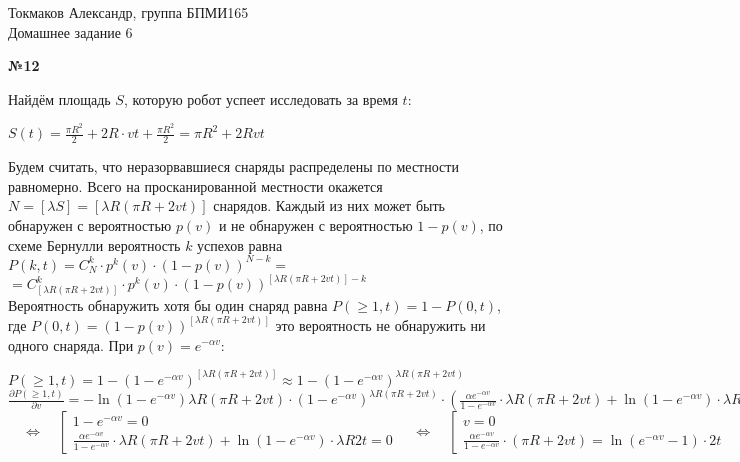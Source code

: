 \documentclass{article}
\newcommand{\impl}{\quad\Leftrightarrow\quad}
\newenvironment{task}{\begin{center}\fontsize{14}{14}\selectfont\bf}{\rm\fontsize{12}{12}\selectfont\end{center}}
\begin{document}
	\begin{center}
		Токмаков Александр, группа БПМИ165 \\
		Домашнее задание 6
	\end{center}
	
	\begin{task} 
		№12
	\end{task}
	Найдём площадь $S$, которую робот успеет исследовать за время $t$:
	\begin{center}
		$S(t) = \frac{\pi R^2}{2} + 2R\cdot vt + \frac{\pi R^2}{2} = \pi R^2 + 2Rvt$
	\end{center}
	Будем считать, что неразорвавшиеся снаряды распределены по местности равномерно. Всего на просканированной местности окажется $N = \left[\lambda S\right] = \left[\lambda R(\pi R + 2vt)\right]$ снарядов. Каждый из них может быть обнаружен с вероятностью $p(v)$ и не обнаружен с вероятностью $1 - p(v)$, по схеме Бернулли вероятность $k$ успехов равна $P(k, t) = C_N^k\cdot p^k(v) \cdot (1 - p(v))^{N-k} = $\\ 
	$= C_{\left[\lambda R( \pi R + 2vt)\right]}^k\cdot p^k(v) \cdot (1 - p(v))^{\left[\lambda R(\pi R + 2vt)\right]-k}$ \\
	Вероятность обнаружить хотя бы один снаряд равна $P(\geq 1, t) = 1 - P(0, t)$, где $P(0, t) = (1 - p(v))^{\left[\lambda R(\pi R + 2vt)\right]}$ это вероятность не обнаружить ни одного снаряда. При $p(v) = e^{-\alpha v}$:
	\begin{center}
		$P(\geq 1, t) = 1 - (1 - e^{-\alpha v})^{\left[\lambda R(\pi R + 2vt)\right]} \approx 1 - (1 - e^{-\alpha v})^{\lambda R(\pi R + 2vt)}$ \\
		$\frac{\partial P(\geq 1, t)}{\partial v} = -\ln\left(1 - e^{-\alpha v} \right)\lambda R(\pi R + 2vt)  \cdot (1 - e^{-\alpha v})^{\lambda R(\pi R + 2vt)} 
		\cdot 
		\left( \frac{\alpha e^{-\alpha v}}{1 - e^{-\alpha v}} \cdot \lambda R(\pi R + 2vt) + \ln\left(1 - e^{-\alpha v} \right) \cdot \lambda R2t \right) = 0$ \\
		$\impl 
		\left[\begin{array}{l}
			1 - e^{-\alpha v} = 0 \\
			\frac{\alpha e^{-\alpha v}}{1 - e^{-\alpha v}} \cdot \lambda R(\pi R + 2vt) + \ln\left(1 - e^{-\alpha v} \right) \cdot \lambda R2t = 0
		\end{array} \right. 
		\impl
		\left[\begin{array}{l}
		v = 0 \\
		\frac{\alpha e^{-\alpha v}}{1 - e^{-\alpha v}} \cdot (\pi R + 2vt) = \ln\left(e^{-\alpha v} -1\right) \cdot 2t
		\end{array} \right. $
	\end{center}
	
\end{document}
